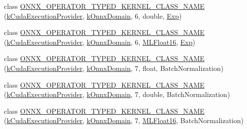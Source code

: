 \begin{DoxyCompactItemize}
\item 
class \mbox{\hyperlink{namespaceonnxruntime_1_1cuda_a9d94978c3af64a3a845168018b16aaec}{O\+N\+N\+X\+\_\+\+O\+P\+E\+R\+A\+T\+O\+R\+\_\+\+T\+Y\+P\+E\+D\+\_\+\+K\+E\+R\+N\+E\+L\+\_\+\+C\+L\+A\+S\+S\+\_\+\+N\+A\+ME}} (\mbox{\hyperlink{namespaceonnxruntime_a73ebc64887ddd1968e3cef47ffefe35b}{k\+Cuda\+Execution\+Provider}}, \mbox{\hyperlink{namespaceonnxruntime_ac0e7c0c106a2c9e9594560a3ab289fa0}{k\+Onnx\+Domain}}, 6, double, \mbox{\hyperlink{classonnxruntime_1_1cuda_1_1Exp}{Exp}})
\item 
class \mbox{\hyperlink{namespaceonnxruntime_1_1cuda_ad599963a8b24e3e797e8d8cd332004fd}{O\+N\+N\+X\+\_\+\+O\+P\+E\+R\+A\+T\+O\+R\+\_\+\+T\+Y\+P\+E\+D\+\_\+\+K\+E\+R\+N\+E\+L\+\_\+\+C\+L\+A\+S\+S\+\_\+\+N\+A\+ME}} (\mbox{\hyperlink{namespaceonnxruntime_a73ebc64887ddd1968e3cef47ffefe35b}{k\+Cuda\+Execution\+Provider}}, \mbox{\hyperlink{namespaceonnxruntime_ac0e7c0c106a2c9e9594560a3ab289fa0}{k\+Onnx\+Domain}}, 6, \mbox{\hyperlink{uniononnxruntime_1_1MLFloat16}{M\+L\+Float16}}, \mbox{\hyperlink{classonnxruntime_1_1cuda_1_1Exp}{Exp}})
\item 
class \mbox{\hyperlink{namespaceonnxruntime_1_1cuda_a441f2acdbe295642d3ecbfb167378ef4}{O\+N\+N\+X\+\_\+\+O\+P\+E\+R\+A\+T\+O\+R\+\_\+\+T\+Y\+P\+E\+D\+\_\+\+K\+E\+R\+N\+E\+L\+\_\+\+C\+L\+A\+S\+S\+\_\+\+N\+A\+ME}} (\mbox{\hyperlink{namespaceonnxruntime_a73ebc64887ddd1968e3cef47ffefe35b}{k\+Cuda\+Execution\+Provider}}, \mbox{\hyperlink{namespaceonnxruntime_ac0e7c0c106a2c9e9594560a3ab289fa0}{k\+Onnx\+Domain}}, 7, float, Batch\+Normalization)
\item 
class \mbox{\hyperlink{namespaceonnxruntime_1_1cuda_a07d88792f2442c15fb07d738a99cfa8f}{O\+N\+N\+X\+\_\+\+O\+P\+E\+R\+A\+T\+O\+R\+\_\+\+T\+Y\+P\+E\+D\+\_\+\+K\+E\+R\+N\+E\+L\+\_\+\+C\+L\+A\+S\+S\+\_\+\+N\+A\+ME}} (\mbox{\hyperlink{namespaceonnxruntime_a73ebc64887ddd1968e3cef47ffefe35b}{k\+Cuda\+Execution\+Provider}}, \mbox{\hyperlink{namespaceonnxruntime_ac0e7c0c106a2c9e9594560a3ab289fa0}{k\+Onnx\+Domain}}, 7, double, Batch\+Normalization)
\item 
class \mbox{\hyperlink{namespaceonnxruntime_1_1cuda_accf21d181cae15937c0708e875855c40}{O\+N\+N\+X\+\_\+\+O\+P\+E\+R\+A\+T\+O\+R\+\_\+\+T\+Y\+P\+E\+D\+\_\+\+K\+E\+R\+N\+E\+L\+\_\+\+C\+L\+A\+S\+S\+\_\+\+N\+A\+ME}} (\mbox{\hyperlink{namespaceonnxruntime_a73ebc64887ddd1968e3cef47ffefe35b}{k\+Cuda\+Execution\+Provider}}, \mbox{\hyperlink{namespaceonnxruntime_ac0e7c0c106a2c9e9594560a3ab289fa0}{k\+Onnx\+Domain}}, 7, \mbox{\hyperlink{uniononnxruntime_1_1MLFloat16}{M\+L\+Float16}}, Batch\+Normalization)

\end{DoxyCompactItemize}
